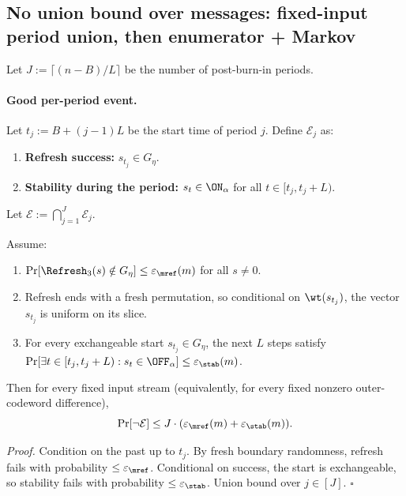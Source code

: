 \subsection{No union bound over messages: fixed-input period union, then enumerator + Markov}
\label{sec:no-union-messages-inner}

Let \(J:=\lceil(n-B)/L\rceil\) be the number of post-burn-in periods.

\paragraph{Good per-period event.}
Let \(t_j:=B+(j-1)L\) be the start time of period \(j\).
Define \(\mathcal{E}_j\) as:
\begin{enumerate}
\item \textbf{Refresh success:} \(s_{t_j}\in G_\eta\).
\item \textbf{Stability during the period:} \(s_t\in \ON_\alpha\) for all \(t\in[t_j,t_j+L)\).
\end{enumerate}
Let \(\mathcal{E}:=\bigcap_{j=1}^J \mathcal{E}_j\).

\begin{lemma}
\label{lem:period-union-interface}
Assume:
\begin{enumerate}
\item \(\Pr[\Refresh_3(s)\notin G_\eta]\le \varepsilon_{\mref}(m)\) for all \(s\neq 0\).
\item Refresh ends with a fresh permutation, so conditional on \(\wt(s_{t_j})\), the vector \(s_{t_j}\) is uniform on its slice.
\item For every exchangeable start \(s_{t_j}\in G_\eta\), the next \(L\) steps satisfy
\(\Pr[\exists t\in[t_j,t_j+L): s_t\in \OFF_\alpha]\le \varepsilon_{\stab}(m)\).
\end{enumerate}
Then for every fixed input stream (equivalently, for every fixed nonzero outer-codeword difference),
\[
\Pr[\neg\mathcal{E}]\le J\cdot(\varepsilon_{\mref}(m)+\varepsilon_{\stab}(m)).
\]
\end{lemma}

\noindent
\emph{Proof.}
Condition on the past up to \(t_j\). By fresh boundary randomness, refresh fails with probability \(\le\varepsilon_{\mref}\).
Conditional on success, the start is exchangeable, so stability fails with probability \(\le\varepsilon_{\stab}\).
Union bound over \(j\in[J]\). \(\square\)


